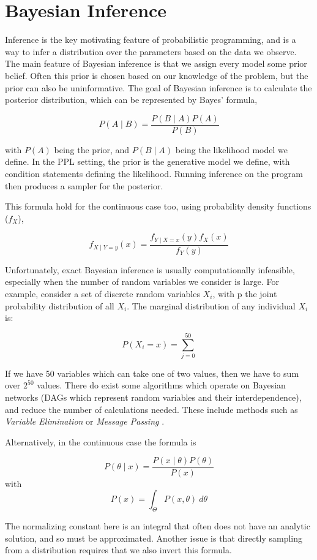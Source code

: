 \section{Bayesian Inference}
Inference is the key motivating feature of probabilistic programming, and is a way to infer a distribution over the parameters based on the data we observe. The main feature of Bayesian inference is that we assign every model some prior belief. Often this prior is chosen based on our knowledge of the problem, but the prior can also be uninformative. The goal of Bayesian inference is to calculate the posterior distribution, which can be represented by Bayes' formula,


$$P(A\mid B)={\frac {P(B\mid A)P(A)}{P(B)}}$$

with $P(A)$ being the prior, and $P(B\mid A)$ being the likelihood model we define. In the PPL setting, the prior is the generative model we define, with condition statements defining the likelihood. Running inference on the program then produces a sampler for the posterior.

This formula hold for the continuous case too, using probability density functions ($f_X$),

$$ f_{X\mid Y=y}(x)={\frac {f_{Y\mid X=x}(y)f_{X}(x)}{f_{Y}(y)}} $$

Unfortunately, exact Bayesian inference is usually computationally infeasible, especially when the number of random variables we consider is large. For example, consider a set of discrete random variables ${X_i}$, with p the joint probability distribution of all $X_i$. The marginal distribution of any individual $X_i$ is:

$$P(X_i=x) = \sum_{j=0}^{50} $$

If we have 50 variables which can take one of two values, then we have to sum over $2^{50}$ values. There do exist some algorithms which operate on Bayesian networks (DAGs which represent random variables and their interdependence), and reduce the number of calculations needed. These include methods such as \textit{Variable Elimination} or \textit{Message Passing} \cite{belief-prop} \cite{}.

Alternatively, in the continuous case the formula is

$$P(\theta\mid x)=\frac{P(x\mid\theta)P(\theta)}{P(x)}$$
with 
$$P(x)=\int_{\Theta}P(x,\theta)~d\theta $$

The normalizing constant here is an integral that often does not have an analytic solution, and so must be approximated. Another issue is that directly sampling from a distribution requires that we also invert this formula.

